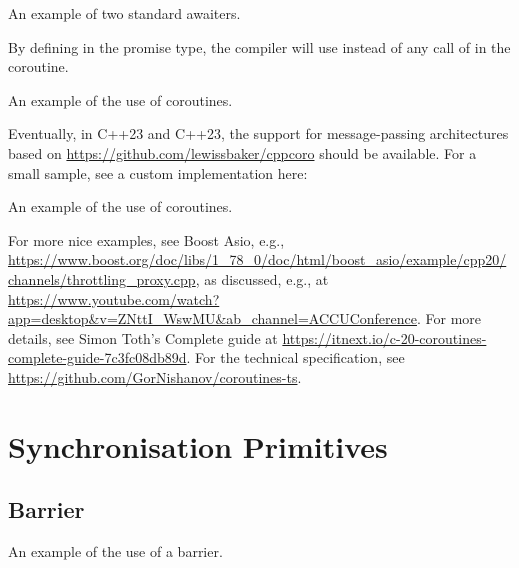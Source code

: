 \begin{itemize}
\begin{end}
\raggedbottom
\begin{codebox}[]{\href{https://godbolt.org/z/}{\ExternalLink}}
\footnotesize An example of two standard awaiters.
\tcblower
{}
\end{codebox}

By defining  in the promise type, the compiler will use  instead of any call of  in the coroutine. 

\raggedbottom
\begin{codebox}[]{\href{https://godbolt.org/z/}{\ExternalLink}}
\footnotesize An example of the use of coroutines.
\tcblower
{}
\end{codebox}

Eventually, in C++23 and C++23, the support for message-passing architectures based on \url{https://github.com/lewissbaker/cppcoro} should be available. For a small sample, see a custom implementation here:

\raggedbottom
\begin{codebox}[]{\href{https://godbolt.org/z/}{\ExternalLink}}
\footnotesize An example of the use of coroutines.
\tcblower
{}
\end{codebox}

For more nice examples, see Boost Asio, e.g.,
\url{https://www.boost.org/doc/libs/1_78_0/doc/html/boost_asio/example/cpp20/channels/throttling_proxy.cpp}, 
as discussed, e.g., at
\url{https://www.youtube.com/watch?app=desktop&v=ZNttI_WswMU&ab_channel=ACCUConference}.
For more details, see Simon Toth's Complete guide at \url{https://itnext.io/c-20-coroutines-complete-guide-7c3fc08db89d}.
For the technical specification, see \url{https://github.com/GorNishanov/coroutines-ts}.

\section{Synchronisation Primitives}

\subsection{Barrier}

\raggedbottom
\begin{codebox}[]{\href{https://godbolt.org/z/}{\ExternalLink}}
\footnotesize An example of the use of a barrier.
\tcblower
{}
\end{codebox}


\end{end}
\end{itemize}
